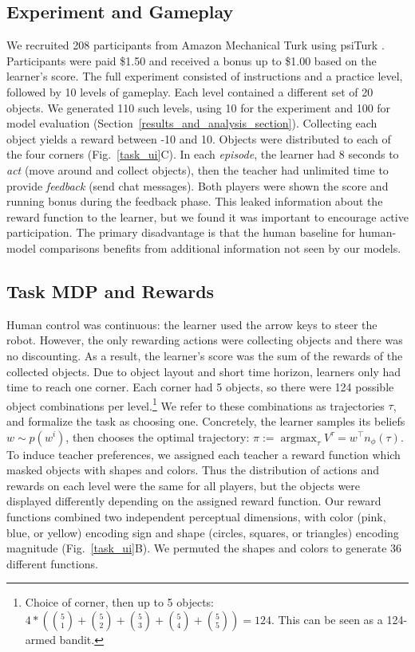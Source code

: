 \documentclass[letterpaper]{article} %
\DeclareMathOperator*{\argmax}{argmax}
\begin{document}
\subsection{Experiment and Gameplay}
We recruited 208 participants from Amazon Mechanical Turk using psiTurk \cite{gureckis_2016}. Participants were paid \$1.50 and received a bonus up to \$1.00 based on the learner's score. The full experiment consisted of instructions and a practice level, followed by 10 levels of gameplay. Each level contained a different set of 20 objects. We generated 110 such levels, using 10 for the experiment and 100 for model evaluation (Section~\ref{results_and_analysis_section}). Collecting each object yields a reward between -10 and 10. Objects were distributed to each of the four corners (Fig.~\ref{task_ui}C). In each \emph{episode}, the learner had 8 seconds to \emph{act} (move around and collect objects), then the teacher had unlimited time to provide \emph{feedback} (send chat messages). Both players were shown the score and running bonus during the feedback phase. This leaked information about the reward function to the learner, but we found it was important to encourage active participation. The primary disadvantage is that the human baseline for human-model comparisons benefits from additional information not seen by our models.

\subsection{Task MDP and Rewards}
\label{task_mdp}
\label{reward_functions}
Human control was continuous: the learner used the arrow keys to steer the robot. However, the only rewarding actions were collecting objects and there was no discounting. As a result, the learner's score was the sum of the rewards of the collected objects. Due to object layout and short time horizon, learners only had time to reach one corner. Each corner had 5 objects, so there were 124 possible object combinations per level.\footnote{Choice of corner, then up to 5 objects: $4 * ({5 \choose 1} + {5 \choose 2} + {5 \choose 3} + {5 \choose 4} + {5 \choose 5}) = 124$. This can be seen as a 124-armed bandit.} We refer to these combinations as trajectories $\tau$, and formalize the task as choosing one. Concretely, the learner samples its beliefs $w \sim p(w^i)$, then chooses the optimal trajectory: $\pi := \argmax_\tau V^\tau = w^{\top} n_\phi(\tau)$. To induce teacher preferences, we assigned each teacher a reward function which masked objects with shapes and colors. Thus the distribution of actions and rewards on each level were the same for all players, but the objects were displayed differently depending on the assigned reward function. Our reward functions combined two independent perceptual dimensions, with color (pink, blue, or yellow) encoding sign and shape (circles, squares, or triangles) encoding magnitude (Fig.~\ref{task_ui}B). We permuted the shapes and colors to generate 36 different functions. 
    
\end{document}

